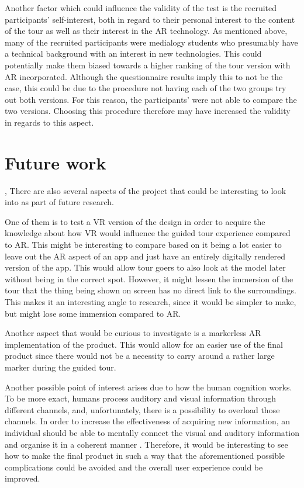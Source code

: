 Another factor which could influence the validity of the test is the recruited participants’ self-interest, both in regard to their personal interest to the content of the tour as well as their interest in the AR technology. As mentioned above, many of the recruited participants were medialogy students who presumably have a technical background with an interest in new technologies. This could potentially make them biased towards a higher ranking of the tour version with AR incorporated. Although the questionnaire results imply this to not be the case, this could be due to the procedure not having each of the two groups try out both versions. For this reason, the participants’ were not able to compare the two versions. Choosing this procedure therefore may have increased the validity in regards to this aspect.  

\section{Future work},
There are also several aspects of the project that could be interesting to look into as part of future research. 

One of them is to test a VR version of the design in order to acquire the knowledge about how VR would influence the guided tour experience compared to AR. This might be interesting to compare based on it being a lot easier to leave out the AR aspect of an app and just have an entirely digitally rendered version of the app. This would allow tour goers to also look at the model later without being in the correct spot. However, it might lessen the immersion of the tour that the thing being shown on screen has no direct link to the surroundings. This makes it an interesting angle to research, since it would be simpler to make, but might lose some immersion compared to AR. 

Another aspect that would be curious to investigate is a markerless AR implementation of the product. This would allow for an easier use of the final product since there would not be a necessity to carry around a rather large marker during the guided tour.
  
Another possible point of interest arises due to how the human cognition works. To be more exact, humans process auditory and visual information through different channels, and, unfortunately, there is a possibility to overload those channels. In order to increase the effectiveness of acquiring new information, an individual should be able to mentally connect the visual and auditory information and organise it in a coherent manner \cite{audiovisual_learning}. Therefore, it would be interesting to see how to make the final product in such a way that the aforementioned possible complications could be avoided and the overall user experience could be improved.

